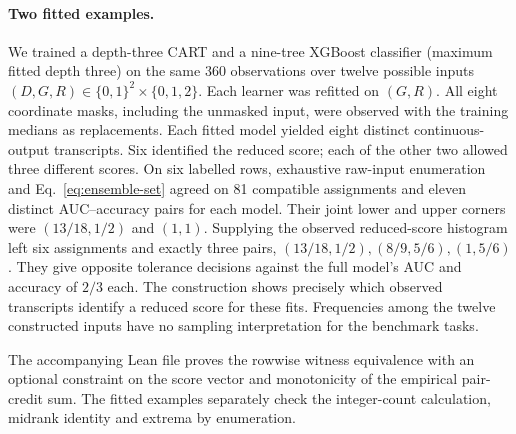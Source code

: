 \paragraph{Two fitted examples.}
We trained a depth-three CART and a nine-tree XGBoost classifier (maximum fitted depth three) on the same 360 observations over twelve possible inputs $(D,G,R)\in\{0,1\}^2\times\{0,1,2\}$. Each learner was refitted on $(G,R)$. All eight coordinate masks, including the unmasked input, were observed with the training medians as replacements. Each fitted model yielded eight distinct continuous-output transcripts. Six identified the reduced score; each of the other two allowed three different scores. On six labelled rows, exhaustive raw-input enumeration and Eq.~\eqref{eq:ensemble-set} agreed on 81 compatible assignments and eleven distinct AUC--accuracy pairs for each model. Their joint lower and upper corners were $(13/18,1/2)$ and $(1,1)$. Supplying the observed reduced-score histogram left six assignments and exactly three pairs, $(13/18,1/2),(8/9,5/6),(1,5/6)$. They give opposite tolerance decisions against the full model's AUC and accuracy of $2/3$ each. The construction shows precisely which observed transcripts identify a reduced score for these fits. Frequencies among the twelve constructed inputs have no sampling interpretation for the benchmark tasks.

The accompanying Lean file proves the rowwise witness equivalence with an optional constraint on the score vector and monotonicity of the empirical pair-credit sum. The fitted examples separately check the integer-count calculation, midrank identity and extrema by enumeration.

